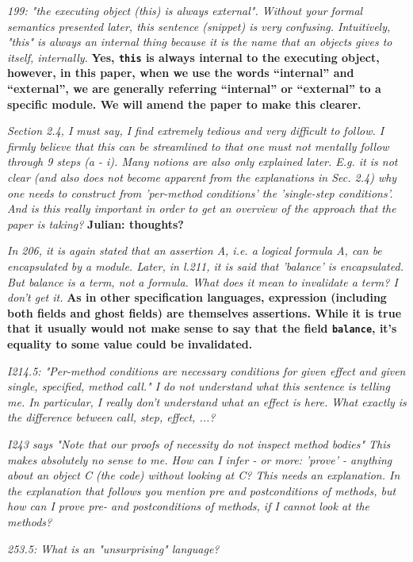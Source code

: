 \documentclass[11pt]{amsart}
\newcommand{\rev}[1]{\emph #1}
\newcommand{\us}[1]{\bf #1}
\begin{document}
{\rev {{199: "the executing object (this) is always external". Without your formal semantics presented later, this sentence (snippet) is very confusing. Intuitively, "this" is always an internal thing because it is the name that an objects gives to itself, internally. }}}
{\us{Yes, \texttt{this} is always internal to the executing object, however, in this paper, when we use the words ``internal'' and ``external'', we are generally referring ``internal'' or ``external'' to 
a specific module. We will amend the paper to make this clearer.}}

{\rev {{ Section 2.4, I must say, I find extremely tedious and very difficult to follow. I firmly believe that this can be streamlined to that one must not mentally follow through 9 steps (a - i). Many notions are also only explained later. E.g. it is not clear (and also does not become apparent from the explanations in Sec. 2.4) why one needs to construct from 'per-method conditions' the 'single-step conditions'. And is this really important in order to get an overview of the approach that the paper is taking? }}}
{\us{Julian: thoughts?}}

 {\rev {{  In 206, it is again stated that an assertion A, i.e. a logical formula A, can be encapsulated by a module. Later, in l.211, it is said that 'balance' is encapsulated. But balance is a term, not a formula. What does it mean to invalidate a term? I don't get it. }}}
 {\us{As in other specification languages, expression (including both fields and ghost fields) are themselves assertions. While it is true that it usually would 
 not make sense to say that the field \texttt{balance}, it's equality to some value could be invalidated.}}

{\rev {{I214.5: "Per-method conditions are necessary conditions for given effect and given single, specified, method call." I do not understand what this sentence is telling me. In particular, I really don't understand what an effect is here. What exactly is the difference between call, step, effect, ...? }}}

{\rev {{I243 says "Note that our proofs of necessity do not inspect method bodies" This makes absolutely no sense to me. How can I infer - or more: 'prove' - anything about an object C (the code) without looking at C? This needs an explanation. In the explanation that follows you mention pre and postconditions of methods, but how can I prove pre- and postconditions of methods, if I cannot look at the methods? }}}

{\rev {{253.5: What is an "unsurprising" language?}}}
\end{document}
